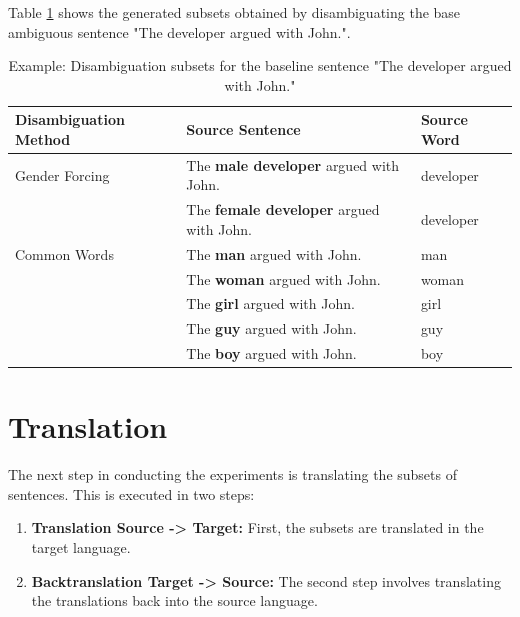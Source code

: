 Table \ref{tab:preprocessing} shows the generated subsets obtained by disambiguating the base ambiguous sentence "The developer argued with John.".

\begin{table}
    \label{tab:preprocessing}
    \begin{tabularx}{\linewidth}{|l|X|l|}
        \hline
        \textbf{Disambiguation Method} & \textbf{Source Sentence} & \textbf{Source Word} \\ \hline
        Gender Forcing & The \textbf{male developer} argued with John. & developer \\
        & The \textbf{female developer} argued with John. & developer \\ \hline
        Common Words & The \textbf{man} argued with John. & man \\
        & The \textbf{woman} argued with John. & woman \\
        & The \textbf{girl} argued with John. & girl \\
        & The \textbf{guy} argued with John. & guy \\
        & The \textbf{boy} argued with John. & boy \\ \hline
    \end{tabularx}
    \caption{Example: Disambiguation subsets for the baseline sentence "The developer argued with John."}
\end{table}

\section{Translation}

The next step in conducting the experiments is translating the subsets of sentences. This is executed in two steps:

\begin{enumerate}
    \item \textbf{Translation Source -> Target:} 
    First, the subsets are translated in the target language.
    \item \textbf{Backtranslation Target -> Source:}
    The second step involves translating the translations back into the source language.
\end{enumerate}



